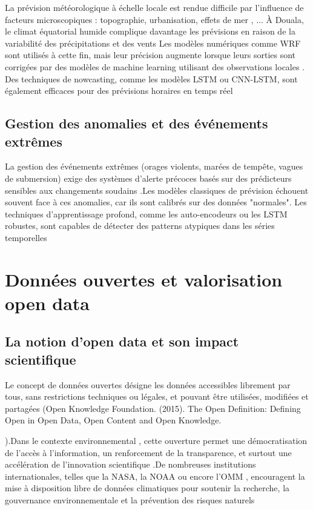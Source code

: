 \documentclass[a4paper,12pt,openany]{report}
\begin{document}
\quad La prévision météorologique à échelle locale est rendue difficile par l’influence de facteurs microscopiques : topographie, urbanisation, effets de mer , ... À Douala, le climat équatorial humide complique davantage les prévisions en raison de la variabilité des précipitations et des vents \cite{Akinsanola2015}
Les modèles numériques comme WRF  sont utilisés à cette fin, mais leur précision augmente lorsque leurs sorties sont corrigées par des modèles de machine learning utilisant des observations locales \cite{Abraham2019}.
Des techniques de nowcasting, comme les modèles LSTM ou CNN-LSTM, sont également efficaces pour des prévisions horaires en temps réel \cite{Shi2015}

\subsection{Gestion des anomalies et des événements extrêmes}
\quad La gestion des événements extrêmes (orages violents, marées de tempête, vagues de submersion) exige des systèmes d’alerte précoces basés sur des prédicteurs sensibles aux changements soudains \cite{UNDRR2022}.Les modèles classiques de prévision échouent souvent face à ces anomalies, car ils sont calibrés sur des données "normales". Les techniques d’apprentissage profond, comme les auto-encodeurs ou les LSTM robustes, sont capables de détecter des patterns atypiques dans les séries temporelles \cite{Chalapathy2019}
\section{Données ouvertes et valorisation open data}
\subsection{La notion d’open data et son impact scientifique}
\quad Le concept de données ouvertes désigne les données accessibles librement par tous, sans restrictions techniques ou légales, et pouvant être utilisées, modifiées et partagées (Open Knowledge Foundation. (2015). The Open Definition: Defining Open in Open Data, Open Content and Open Knowledge.

).Dans le contexte environnemental , cette ouverture permet une démocratisation de l’accès à l’information, un renforcement de la transparence, et surtout une accélération de l’innovation scientifique \cite{Kitchin2014}.De nombreuses institutions internationales, telles que la NASA, la NOAA ou encore l’OMM , encouragent la mise à disposition libre de données climatiques pour soutenir la recherche, la gouvernance environnementale et la prévention des risques naturels\cite{OMM2021} 
\end{document}
